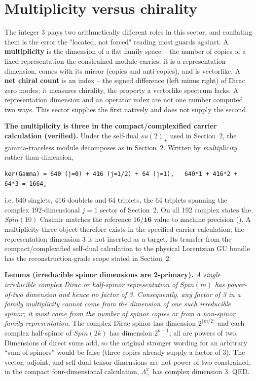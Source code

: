 \documentclass[11pt]{article}
\theoremstyle{remark}
\begin{document}
\section{Multiplicity versus chirality}
The integer 3 plays two arithmetically different roles in this sector, and conflating them is the error the "located, not forced" reading most guards against. A \textbf{multiplicity} is the dimension of a flat family space -- the number of copies of a fixed representation the constrained module carries; it is a representation dimension, comes with its mirror (copies and anti-copies), and is vectorlike. A \textbf{net chiral count} is an index -- the signed difference (left minus right) of Dirac zero modes; it measures chirality, the property a vectorlike spectrum lacks. A representation dimension and an operator index are not one number computed two ways. This sector supplies the first natively and does not supply the second.

\textbf{The multiplicity is three in the compact/complexified carrier calculation (verified).} Under the self-dual $su(2)_+$ used in Section~2, the gamma-traceless module decomposes as in Section~2. Written by \emph{multiplicity} rather than dimension,

\begin{lstlisting}
ker(Gamma) = 640 (j=0) + 416 (j=1/2) + 64 (j=1),   640*1 + 416*2 + 64*3 = 1664,
\end{lstlisting}
i.e. 640 singlets, 416 doublets and 64 triplets, the 64 triplets spanning the complex 192-dimensional $j=1$ sector of Section~2. On all 192 complex states the $Spin(10)$ Casimir matches the reference $16 / \overline{\mathbf{16}}$ value to machine precision (). A multiplicity-three object therefore exists in the specified carrier calculation; the representation dimension 3 is not inserted as a target. Its transfer from the compact/complexified self-dual calculation to the physical Lorentzian GU bundle has the reconstruction-grade scope stated in Section~2.

\textbf{Lemma (irreducible spinor dimensions are 2-primary).} \emph{A single irreducible complex Dirac or half-spinor representation of $Spin(m)$ has power-of-two dimension and hence no factor of 3. Consequently, any factor of 3 in a family multiplicity cannot come from the dimension of one such irreducible spinor; it must come from the number of spinor copies or from a non-spinor family representation.} The complex Dirac spinor has dimension $2^{\lfloor m/2\rfloor}$ and each complex half-spinor of $Spin(2k)$ has dimension $2^{k-1}$; all are powers of two. Dimensions of direct sums add, so the original stronger wording for an arbitrary ``sum of spinors'' would be false (three copies already supply a factor of 3). The vector, adjoint, and self-dual tensor dimensions are not power-of-two constrained; in the compact four-dimensional calculation, $\Lambda^2_+$ has complex dimension 3. QED.
\end{document}
